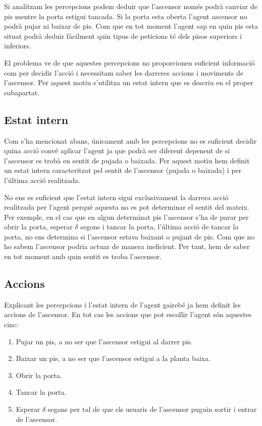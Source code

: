 \documentclass[a4paper, 11pt]{article}
\begin{document}
Si analitzam les percepcions podem deduir que l'ascensor només podrà canviar de
pis mentre la porta estigui tancada. Si la porta esta oberta l'agent ascensor
no podrà pujar ni baixar de pis. Com que en tot moment l'agent sap en quin pis
esta situat podrà deduir fàcilment quin tipus de peticions té dels pisos
superiors i inferiors.

El problema ve de que aquestes percepcions no proporcionen suficient informació
com per decidir l'acció i necessitam saber les darreres accions i moviments de
l'ascensor. Per aquest motiu s'utilitza un estat intern que es descriu en el
proper subapartat.

\subsection{Estat intern}

Com s'ha mencionat abans, únicament amb les percepcions no es suficient decidir
quina acció convé aplicar l'agent ja que podrà ser diferent depenent de si
l'ascensor es trobà en sentit de pujada o baixada. Per aquest motiu hem definit
un estat intern caracteritzat pel sentit de l'ascensor (pujada o baixada) i per
l'última acció realitzada.

No ens es suficient que l'estat intern sigui exclusivament la darrera acció
realitzada per l'agent perquè aquesta no es pot determinar el sentit del
mateix.  Per exemple, en el cas que en algun determinat pis l'ascensor s'ha de
parar per obrir la porta, esperar $\delta$ segons i tancar la porta, l'última
acció de tancar la porta, no ens determina si l'ascensor estava baixant o
pujant de pis.  Com que no ho sabem l'ascensor podria actuar de manera
ineficient. Per tant, hem de saber en tot moment amb quin sentit es troba
l'ascensor.

\subsection{Accions}

Explicant les percepcions i l'estat intern de l'agent gairebé ja hem definit
les accions de l'ascensor. En tot cas les accions que pot escollir l'agent són
aquestes cinc:

\begin{enumerate}
  \item Pujar un pis, a no ser que l'ascensor estigui al darrer pis.
  \item Baixar un pis, a no ser que l'ascensor estigui a la planta baixa.
  \item Obrir la porta.
  \item Tancar la porta.
  \item Esperar $\delta$ segons per tal de que els usuaris de l'ascensor puguin 
  sortir i entrar de l'ascensor.
\end{enumerate} 
\end{document}
